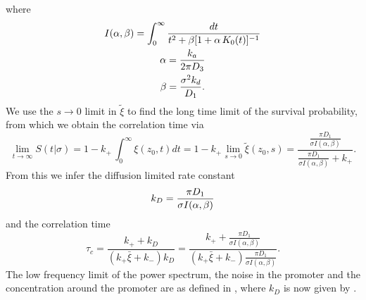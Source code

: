 where
\begin{gather}
 I(\alpha,\beta) = \int_0^{\infty} \frac{dt}{t^2 + \beta[1 + \alpha \, K_0(t)]^{-1}} \\
 \alpha = \frac{k_a}{2 \pi D_3} \elabel{EqAlpha} \\
 \beta = \frac{\sigma^2 k_d}{D_1} \elabel{EqBeta}.
\end{gather}
We use the $s \rightarrow 0$ limit in $\tilde{\xi}$ to find the long time limit of the survival probability, from which we obtain the correlation time via 
\begin{equation}
  \lim_{t \rightarrow \infty}S(t|\sigma) = 1 - k_+ \, \int_0^{\infty} \xi(z_0, t) dt = 1 - k_+ \lim_{s \rightarrow 0} \tilde{\xi}(z_0, s) = \frac{\frac{\pi D_1}{\sigma I(\alpha,\beta)}}{\frac{\pi D_1}{\sigma I(\alpha,\beta)} + k_+}.
\end{equation}
From this we infer the diffusion limited rate constant
\begin{equation}
 k_D = \frac{\pi D_1}{\sigma I(\alpha,\beta)}
 \elabel{kDFullJ}
\end{equation}
and the correlation time
\begin{equation}
 \tau_c = \frac{k_+ + k_D}{(k_+ \bar{\xi} + k_-) k_D} = \frac{k_+ + \frac{\pi D_1}{\sigma I(\alpha,\beta)}}{(k_+ \bar{\xi} + k_-) \frac{\pi D_1}{\sigma I(\alpha,\beta)}}.
\end{equation}
The low frequency limit of the power spectrum, the noise in the promoter and the concentration around the promoter are as defined in , where $k_D$ is now given by .


